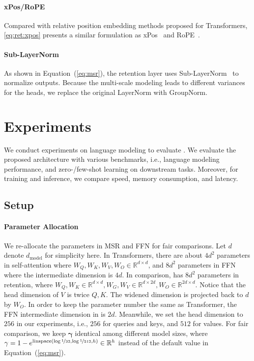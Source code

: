 \paragraph{xPos/RoPE}
Compared with relative position embedding methods proposed for Transformers, \ref{eq:ret:xpos} presents a similar formulation as xPos~\cite{lex} and RoPE~\cite{rotary}.

\paragraph{Sub-LayerNorm}
As shown in Equation~(\ref{eq:msr}), the retention layer uses Sub-LayerNorm~\cite{magneto} to normalize outputs. Because the multi-scale modeling leads to different variances for the heads, we replace the original LayerNorm with GroupNorm.

\section{Experiments}
\label{sec:exp}

We conduct experiments on language modeling to evaluate \our{}.
We evaluate the proposed architecture with various benchmarks, i.e., language modeling performance, and zero-/few-shot learning on downstream tasks. Moreover, for training and inference, we compare speed, memory consumption, and latency.

\subsection{Setup}
\label{sec:setup}

\paragraph{Parameter Allocation} We re-allocate the parameters in MSR and FFN for fair comparisons. Let $d$ denote $d_\text{model}$ for simplicity here. In Transformers, there are about $4d^2$ parameters in self-attention where $W_Q, W_K, W_V, W_O\in\mathbb{R}^{d\times d}$, and $8d^2$ parameters in FFN where the intermediate dimension is $4d$. In comparison, \our{} has $8d^2$ parameters in retention, where $W_Q, W_K\in\mathbb{R}^{d\times d}, W_G,W_V\in\mathbb{R}^{d\times 2d}, W_O\in\mathbb{R}^{2d\times d}$. Notice that the head dimension of $V$ is twice $Q, K$. The widened dimension is projected back to $d$ by $W_O$. In order to keep the parameter number the same as Transformer, the FFN intermediate dimension in \our{} is $2d$. Meanwhile, we set the head dimension to $256$ in our experiments, i.e., $256$ for queries and keys, and $512$ for values. For fair comparison, we keep $\mathbf{\gamma}$ identical among different model sizes, where $\mathbf{\gamma} = 1 - e^{\mathrm{linspace}(\log\nicefrac{1}{32}, \log\nicefrac{1}{512}, h)} \in \mathbb{R}^{h}$ instead of the default value in Equation~(\ref{eq:msr}).

